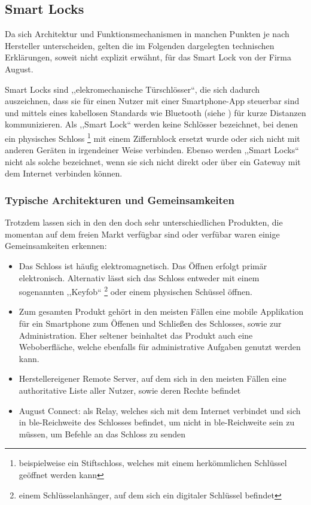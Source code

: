 \subsection{Smart Locks}
\label{sec:sota_smart_locks}

    Da sich Architektur und Funktionsmechanismen in manchen Punkten je nach Hersteller unterscheiden, gelten die im Folgenden dargelegten technischen Erklärungen, soweit nicht explizit erwähnt, für das Smart Lock von der Firma August.
    
    Smart Locks sind ,,elekromechanische Türschlösser``, die sich dadurch auszeichnen, dass sie für einen Nutzer mit einer Smartphone-App steuerbar sind und mittels eines kabellosen Standards wie Bluetooth (siehe ) für kurze Distanzen kommunizieren.
    \medskip
	Als ,,Smart Lock`` werden keine Schlösser bezeichnet, bei denen ein physisches Schloss \footnote{beispielweise ein Stiftschloss, welches mit einem herkömmlichen Schlüssel geöffnet werden kann} mit einem Ziffernblock ersetzt wurde oder sich nicht mit anderen Geräten in irgendeiner Weise verbinden. 
	Ebenso werden ,,Smart Locks`` nicht als solche bezeichnet, wenn sie sich nicht direkt oder über ein Gateway mit dem Internet verbinden können.\cite{Ho2016}
	
	\subsubsection{Typische Architekturen und Gemeinsamkeiten}
	    Trotzdem lassen sich in den den doch sehr unterschiedlichen Produkten, die momentan auf dem freien Markt verfügbar sind oder verfübar waren einige Gemeinsamkeiten erkennen\cite{Ye2017,Fuller2017}: 
		\begin{itemize}
			\item Das Schloss ist häufig elektromagnetisch. 
			Das Öffnen erfolgt primär elektronisch. 
			Alternativ lässt sich das Schloss entweder mit einem sogenannten ,,Keyfob`` \footnote{einem Schlüsselanhänger, auf dem sich ein digitaler Schlüssel befindet} oder einem physischen Schüssel öffnen.
			\item Zum gesamten Produkt gehört in den meisten Fällen eine mobile Applikation für ein Smartphone zum Öffenen und Schließen des Schlosses, sowie zur Administration. 
			Eher seltener beinhaltet das Produkt auch eine Weboberfläche, welche ebenfalls für administrative Aufgaben genutzt werden kann.
			\item Herstellereigener Remote Server, auf dem sich in den meisten Fällen eine authoritative Liste aller Nutzer, sowie deren Rechte befindet
			\item August Connect: als Relay, welches sich mit dem Internet verbindet und sich in \gls{ble}-Reichweite des Schlosses befindet, um nicht in \gls{ble}-Reichweite sein zu müssen, um Befehle an das Schloss zu senden
		\end{itemize}
		
